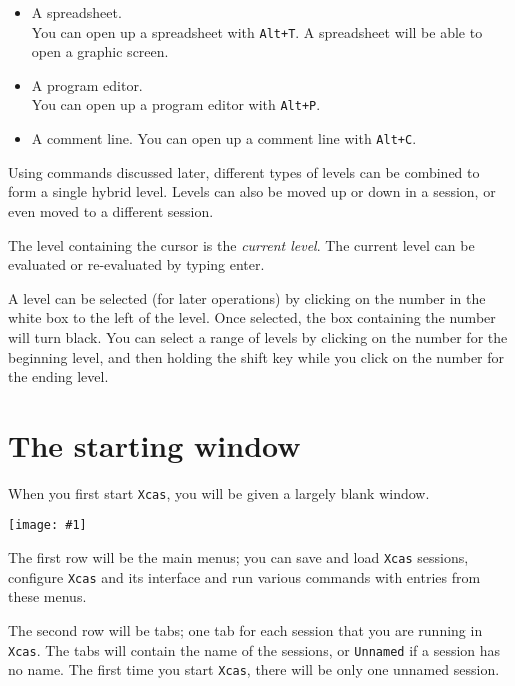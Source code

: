 \documentclass[a4paper,11pt]{book}
\newcommand{\includeimage}[1]
{\texttt{[image: \#1]}}
\begin{document}
\begin{itemize}
  \item A spreadsheet.\\
  You can open up a spreadsheet with \texttt{Alt+T}.
  A spreadsheet will be able to open a graphic screen.
  
  \item A program editor.\\
  You can open up a program editor with
  \texttt{Alt+P}.
  
  \item A comment line.  You can open up a comment line with
  \texttt{Alt+C}.
\end{itemize}
Using commands discussed later, different types of levels can be
combined to form a single hybrid level.  Levels can also be moved up
or down in a session, or even moved to a different session.

The level containing the cursor is the \emph{current level}.  The
current level can be evaluated or re-evaluated by typing enter.

A level can be selected (for later operations) by clicking on the
number in the white box to the left of the level.  Once selected, the
box containing the number will turn black.  You can select a range of
levels by clicking on the number for the beginning level, and then
holding the shift key while you click on the number for the ending level.

\section{The starting window}

When you first start \texttt{Xcas}, you will be given a largely blank window.
\begin{center}
  \includeimage{xcas-open.png}
\end{center}
The first row will be the main menus; you can 
save and load \texttt{Xcas} sessions, configure \texttt{Xcas} and its
interface and run various commands with entries from these menus.

The second row will be tabs; one tab for each session that you are
running in \texttt{Xcas}.  The tabs will contain the name of the
sessions, or \texttt{Unnamed} if a session has no name.  The first
time you start \texttt{Xcas}, there will be only one unnamed session.
\end{document}
